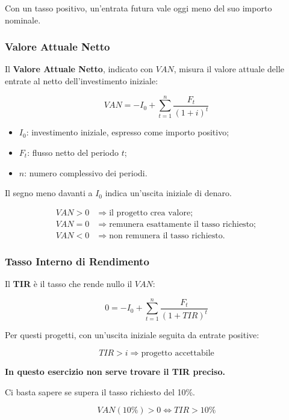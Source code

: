 \noindent Con un tasso positivo,
un'entrata futura vale oggi meno
del suo importo nominale.


\subsubsection*{Valore Attuale Netto}

\noindent Il \textbf{Valore Attuale Netto},
indicato con $VAN$,
misura il valore attuale delle entrate
al netto dell'investimento iniziale:

\[
\boxed{
VAN=-I_0+\sum_{t=1}^{n}
\frac{F_t}{(1+i)^t}
}
\]

\begin{itemize}
    \item $I_0$: investimento iniziale,
    espresso come importo positivo;
    \item $F_t$: flusso netto del periodo $t$;
    \item $n$: numero complessivo dei periodi.
\end{itemize}

\noindent Il segno meno davanti a $I_0$
indica un'uscita iniziale di denaro.

\[
\begin{aligned}
VAN>0
&\Rightarrow \text{il progetto crea valore};\\
VAN=0
&\Rightarrow \text{remunera esattamente il tasso richiesto};\\
VAN<0
&\Rightarrow \text{non remunera il tasso richiesto}.
\end{aligned}
\]


\subsubsection*{Tasso Interno di Rendimento}

\noindent Il \textbf{TIR}
è il tasso che rende nullo il $VAN$:

\[
\boxed{
0=-I_0+\sum_{t=1}^{n}
\frac{F_t}{(1+TIR)^t}
}
\]

\noindent Per questi progetti,
con un'uscita iniziale
seguita da entrate positive:

\[
\boxed{
TIR>i
\Rightarrow
\text{progetto accettabile}
}
\]

\noindent \textbf{In questo esercizio
non serve trovare il TIR preciso.}

\noindent Ci basta sapere
se supera il tasso richiesto del 10\%.

\[
\boxed{
VAN(10\%)>0
\Longleftrightarrow
TIR>10\%
}
\]


